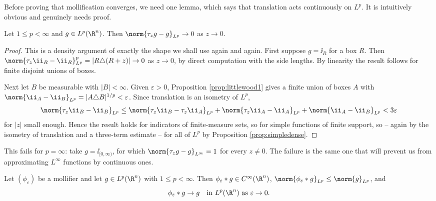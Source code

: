 Before proving that mollification converges, we need one lemma, which says that translation acts continuously on $L^p$. It is intuitively obvious and genuinely needs proof.

\begin{lemma}\label{lem:transcont}
	Let $1 \le p < \infty$ and $g \in L^p(\R^n)$. Then $\norm{\tau_z g - g}_{L^p} \to 0$ as $z \to 0$.
\end{lemma}

\begin{proof}
	This is a density argument of exactly the shape we shall use again and again. First suppose $g = \ii_R$ for a box $R$. Then $\norm{\tau_z \ii_R - \ii_R}_{L^p}^p = |R \triangle (R + z)| \to 0$ as $z \to 0$, by direct computation with the side lengths. By linearity the result follows for finite disjoint unions of boxes.

	Next let $B$ be measurable with $|B| < \infty$. Given $\varepsilon > 0$, Proposition \ref{prop:littlewood1} gives a finite union of boxes $A$ with $\norm{\ii_A - \ii_B}_{L^p} = |A \triangle B|^{1/p}< \varepsilon$. Since translation is an isometry of $L^p$,
	$$\norm{\tau_z \ii_B - \ii_B}_{L^p} \le \norm{\tau_z \ii_B - \tau_z \ii_A}_{L^p} + \norm{\tau_z \ii_A - \ii_A}_{L^p} + \norm{\ii_A - \ii_B}_{L^p} < 3\varepsilon$$
	for $|z|$ small enough. Hence the result holds for indicators of finite-measure sets, so for simple functions of finite support, so -- again by the isometry of translation and a three-term estimate -- for all of $L^p$ by Proposition \ref{prop:simpledense}.
\end{proof}

\begin{remark}
	This fails for $p = \infty$: take $g = \ii_{[0,\infty)}$, for which $\norm{\tau_z g - g}_{L^\infty} = 1$ for every $z \ne 0$. The failure is the same one that will prevent us from approximating $L^\infty$ functions by continuous ones.
\end{remark}

\begin{theorem}[Mollification]\label{thm:mollify}
	Let $(\phi_\varepsilon)$ be a mollifier and let $g \in L^p(\R^n)$ with $1 \le p < \infty$. Then $\phi_\varepsilon * g \in C^\infty(\R^n)$, $\norm{\phi_\varepsilon * g}_{L^p} \le \norm{g}_{L^p}$, and
	$$\phi_\varepsilon * g \to g \quad \text{in } L^p(\R^n) \text{ as } \varepsilon \to 0.$$
\end{theorem}

